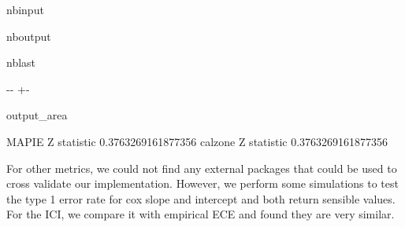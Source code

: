 \documentclass[letterpaper,10pt,english]{sphinxmanual}
\begin{document}
\begin{sphinxuseclass}{nbinput}
{
\begin{sphinxVerbatim}[commandchars=\\\{\}]
\llap{\color{nbsphinxin}[45]:\,\hspace{\fboxrule}\hspace{\fboxsep}}\PYG{p}{[}\PYG{p}{]}
\PYG{p}{[}\PYG{p}{]}
\end{sphinxVerbatim}
}

\end{sphinxuseclass}
\begin{sphinxuseclass}{nboutput}
\begin{sphinxuseclass}{nblast}
{

\kern-\sphinxverbatimsmallskipamount\kern-\baselineskip
\kern+\FrameHeightAdjust\kern-\fboxrule
\vspace{\nbsphinxcodecellspacing}

\begin{sphinxuseclass}{output_area}
\begin{sphinxuseclass}{}


\begin{sphinxVerbatim}[commandchars=\\\{\}]
MAPIE Z statistic 0.3763269161877356
calzone Z statistic 0.3763269161877356
\end{sphinxVerbatim}



\end{sphinxuseclass}
\end{sphinxuseclass}
}

\end{sphinxuseclass}
\end{sphinxuseclass}
\sphinxAtStartPar
For other metrics, we could not find any external packages that could be used to cross validate our implementation. However, we perform some simulations to test the type 1 error rate for cox slope and intercept and both return sensible values. For the ICI, we compare it with empirical ECE and found they are very similar.
\end{document}

